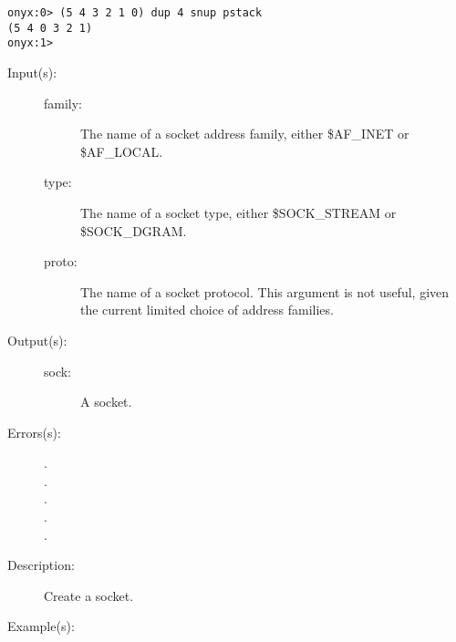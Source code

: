 \begin{description}
\begin{description}
\begin{verbatim}
onyx:0> (5 4 3 2 1 0) dup 4 snup pstack
(5 4 0 3 2 1)
onyx:1>
		\end{verbatim}
	\end{description}
\label{systemdict:socket}
\item[{\onyxop{family type proto}{socket}{sock}}: ]
\item[{\onyxop{family type}{socket}{sock}}: ]
	\begin{description}\item[]
	\item[Input(s): ]
		\begin{description}\item[]
		\item[family: ]
			The name of a socket address family, either \$AF\_INET
			or \$AF\_LOCAL.
		\item[type: ]
			The name of a socket type, either \$SOCK\_STREAM or
			\$SOCK\_DGRAM.
		\item[proto: ]
			The name of a socket protocol.  This argument is not
			useful, given the current limited choice of address
			families.
		\end{description}
	\item[Output(s): ]
		\begin{description}\item[]
		\item[sock: ]
			A socket.
		\end{description}
	\item[Errors(s): ]
		\begin{description}\item[]
		\item[.]
		\item[.]
		\item[.]
		\item[.]
		\item[.]
		\end{description}
	\item[Description: ]
		Create a socket.
	\item[Example(s): ]\begin{verbatim}


\end{verbatim}
\end{description}
\end{description}

